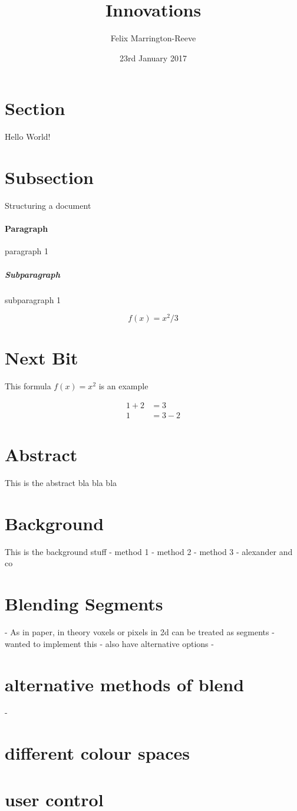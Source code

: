 \documentclass{article}
\title{Innovations}
\date{23rd January 2017}
\author{Felix Marrington-Reeve}
\begin{document}
	
	\maketitle

	\newpage

	\section{Section}
	Hello World!

	\section{Subsection}
	Structuring a document

	\paragraph{Paragraph}
	paragraph 1

	\subparagraph{Subparagraph}
	subparagraph 1

	\begin{equation*} %
		f(x) = x^2/3
	\end{equation*} %

	\section{Next Bit}
	This formula $f(x) = x^2$ is an example

	\begin{align*}
		1 + 2 &= 3 \\
		1 &= 3 - 2
	\end{align*}


	\newpage
	\section{Abstract}
	This is the abstract bla bla bla

	\section{Background}
	This is the background stuff
	- method 1
	- method 2
	- method 3
	- alexander and co

	\section{Blending Segments}
	- As in paper, in theory voxels or pixels in 2d can be treated as segments
	- wanted to implement this
	- also have alternative options
	-
	\section{alternative methods of blend}
	- 
	\section{different colour spaces}

	\section{user control}

	\section{}	
\end{document}
